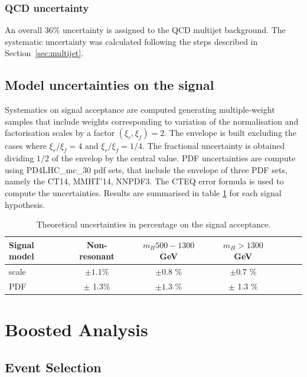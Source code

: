 \subsubsection{QCD uncertainty}
An overall 36\% uncertainty is assigned to the QCD multijet background. The systematic uncertainty was calculated following the steps described in Section~\ref{sec:multijet}. 


\subsection{Model uncertainties on the signal}

Systematics on signal acceptance are computed generating
multiple-weight samples that include weights corresponding to
variation of the normalisation and factorisation scales by a factor
$(\xi_r, \xi_f)= 2$. The envelope is built excluding the cases where
$\xi_r/\xi_f = 4$ and $\xi_r/\xi_f = 1/4$. The fractional uncertainty
is obtained dividing $1/2$ of the envelop by the central value.
PDF uncertainties are compute using PD4LHC\_mc\_30 pdf sets, that
include the envelope of three PDF sets, namely the CT14, MMHT'14,
NNPDF3. The CTEQ error formula is used to compute the uncertainties.
Results are summarised in table \ref{tab:sig_systs} for each signal
hypothesis.

\begin{table}
\centering
\begin{tabular}{l|cc|cc|cc}
\hline
Signal model               & Non-resonant 	& $m_H 500 -1300$ GeV & $m_H > 1300$ GeV    \\\hline 
\hline
scale & $\pm 1.1$\% & $\pm 0.8$ \% & $\pm 0.7$ \% \\
PDF & $\pm$ 1.3\% & $\pm 1.3$ \% & $\pm$ 1.3 \% \\
\hline
\end{tabular}
\caption{Theoretical uncertainties in percentage on the signal acceptance.}

\label{tab:sig_systs}
\end{table}







\section{Boosted Analysis}
\subsection{Event Selection}
